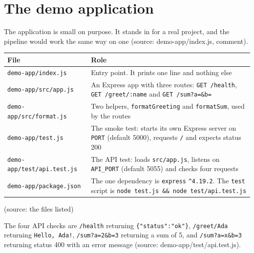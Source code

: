 \documentclass[11pt,a4paper]{report}
\begin{document}
\section{The demo application}

The application is small on purpose. It stands in for a real project, and the pipeline would work the same way on one (source: demo-app/index.js, comment).

\begin{longtable}{>{\raggedright\arraybackslash}p{0.310\dimexpr\linewidth-4\tabcolsep\relax}>{\raggedright\arraybackslash}p{0.690\dimexpr\linewidth-4\tabcolsep\relax}}
\toprule
\textbf{File} & \textbf{Role} \\
\midrule
\endhead
\texttt{demo-\allowbreak{}app/\allowbreak{}index.\allowbreak{}js} & Entry point. It prints one line and nothing else \\
\texttt{demo-\allowbreak{}app/\allowbreak{}src/\allowbreak{}app.\allowbreak{}js} & An Express app with three routes: \texttt{GET /\allowbreak{}health}, \texttt{GET /\allowbreak{}greet/\allowbreak{}:name} and \texttt{GET /\allowbreak{}sum?a=\&b=} \\
\texttt{demo-\allowbreak{}app/\allowbreak{}src/\allowbreak{}format.\allowbreak{}js} & Two helpers, \texttt{formatGreeting} and \texttt{formatSum}, used by the routes \\
\texttt{demo-\allowbreak{}app/\allowbreak{}test.\allowbreak{}js} & The smoke test: starts its own Express server on \texttt{PORT} (default 5000), requests \texttt{/\allowbreak{}} and expects status 200 \\
\texttt{demo-\allowbreak{}app/\allowbreak{}test/\allowbreak{}api.\allowbreak{}test.\allowbreak{}js} & The API test: loads \texttt{src/\allowbreak{}app.\allowbreak{}js}, listens on \texttt{API\_\allowbreak{}PORT} (default 5055) and checks four requests \\
\texttt{demo-\allowbreak{}app/\allowbreak{}package.\allowbreak{}json} & The one dependency is \texttt{express} \texttt{\textasciicircum{}4.\allowbreak{}19.\allowbreak{}2}. The \texttt{test} script is \texttt{node test.\allowbreak{}js \&\& node test/\allowbreak{}api.\allowbreak{}test.\allowbreak{}js} \\
\bottomrule
\end{longtable}

(source: the files listed)

The four API checks are \texttt{/\allowbreak{}health} returning \texttt{\{"status":"ok"\}}, \texttt{/\allowbreak{}greet/\allowbreak{}Ada} returning \texttt{Hello, Ada!}, \texttt{/\allowbreak{}sum?a=2\&b=3} returning a sum of 5, and \texttt{/\allowbreak{}sum?a=x\&b=3} returning status 400 with an error message (source: demo-app/test/api.test.js).
\end{document}
